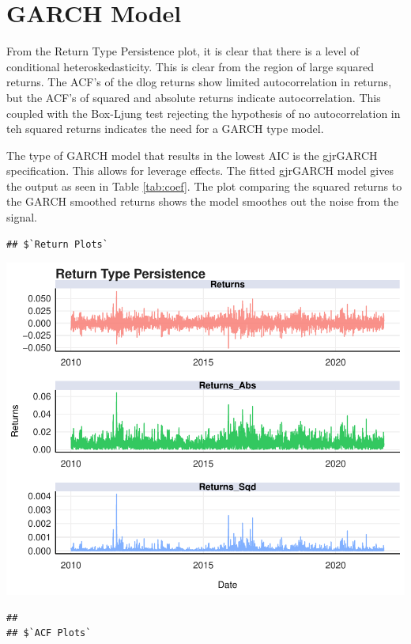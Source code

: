 \documentclass[11pt,preprint, authoryear]{elsarticle}
\numberwithin{equation}{section}
\numberwithin{figure}{section}
\numberwithin{table}{section}
\begin{document}
\hypertarget{garch-model}{%
\section{GARCH Model}\label{garch-model}}

From the Return Type Persistence plot, it is clear that there is a level
of conditional heteroskedasticity. This is clear from the region of
large squared returns. The ACF's of the dlog returns show limited
autocorrelation in returns, but the ACF's of squared and absolute
returns indicate autocorrelation. This coupled with the Box-Ljung test
rejecting the hypothesis of no autocorrelation in teh squared returns
indicates the need for a GARCH type model.

\par

The type of GARCH model that results in the lowest AIC is the gjrGARCH
specification. This allows for leverage effects. The fitted gjrGARCH
model gives the output as seen in Table \ref{tab:coef}. The plot
comparing the squared returns to the GARCH smoothed returns shows the
model smoothes out the noise from the signal.

\begin{verbatim}
## $`Return Plots`
\end{verbatim}

\includegraphics{Question4_files/figure-latex/q4_2-1.pdf}

\begin{verbatim}
## 
## $`ACF Plots`
\end{verbatim}
\end{document}
